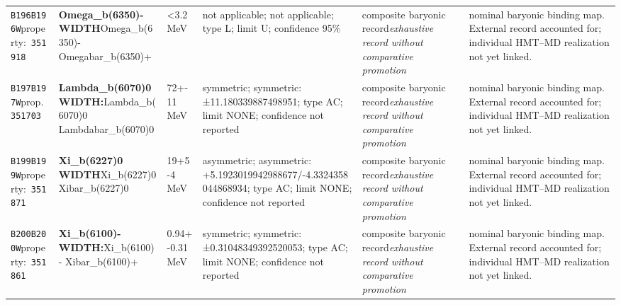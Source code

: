 \begin{landscape}
\begin{longtable}{L{1.85cm}L{4.45cm}L{2.35cm}L{4.05cm}L{3.35cm}L{7.15cm}}
\texttt{B196}\newline \texttt{B196W}\newline property:\ \texttt{351918} & \textbf{Omega\_\allowbreak{}b(6350)- WIDTH}\newline Omega\_\allowbreak{}b(6350)- \textbar{}\allowbreak{} Omegabar\_\allowbreak{}b(6350)+ & \textless{}3.2\,MeV & not applicable; not applicable; type L; limit U; confidence 95\% & composite baryonic record\newline \emph{exhaustive record without comparative promotion} & nominal baryonic binding map. External record accounted for; individual HMT--MD realization not yet linked. \\
\texttt{B197}\newline \texttt{B197W}\newline prop.\ \texttt{351703} & \textbf{Lambda\_\allowbreak{}b(6070)0 WIDTH:}\newline Lambda\_\allowbreak{}b(6070)0 \textbar{}\allowbreak{} Lambdabar\_\allowbreak{}b(6070)0 & 72+-11\,MeV & symmetric; symmetric: ±11.180339887498951; type AC; limit NONE; confidence not reported & composite baryonic record\newline \emph{exhaustive record without comparative promotion} & nominal baryonic binding map. External record accounted for; individual HMT--MD realization not yet linked. \\
\texttt{B199}\newline \texttt{B199W}\newline property:\ \texttt{351871} & \textbf{Xi\_\allowbreak{}b(6227)0 WIDTH}\newline Xi\_\allowbreak{}b(6227)0 \textbar{}\allowbreak{} Xibar\_\allowbreak{}b(6227)0 & 19+5-4\,MeV & asymmetric; asymmetric: +5.1923019942988677/-4.3324358044868934; type AC; limit NONE; confidence not reported & composite baryonic record\newline \emph{exhaustive record without comparative promotion} & nominal baryonic binding map. External record accounted for; individual HMT--MD realization not yet linked. \\
\texttt{B200}\newline \texttt{B200W}\newline property:\ \texttt{351861} & \textbf{Xi\_\allowbreak{}b(6100)- WIDTH:}\newline Xi\_\allowbreak{}b(6100)- \textbar{}\allowbreak{} Xibar\_\allowbreak{}b(6100)+ & 0.94+-0.31\,MeV & symmetric; symmetric: ±0.31048349392520053; type AC; limit NONE; confidence not reported & composite baryonic record\newline \emph{exhaustive record without comparative promotion} & nominal baryonic binding map. External record accounted for; individual HMT--MD realization not yet linked. \\

\end{longtable}
\end{landscape}
